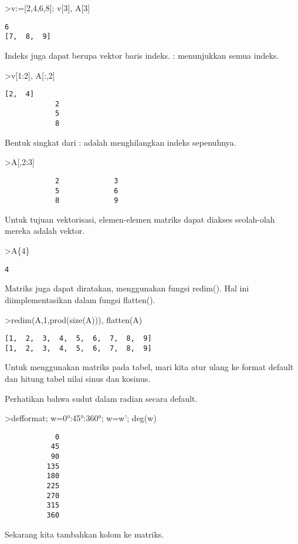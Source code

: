 \documentclass[
]{book}
\begin{document}
\textgreater v:={[}2,4,6,8{]}; v{[}3{]}, A{[}3{]}

\begin{verbatim}
6
[7,  8,  9]
\end{verbatim}

Indeks juga dapat berupa vektor baris indeks. : menunjukkan semua indeks.

\textgreater v{[}1:2{]}, A{[}:,2{]}

\begin{verbatim}
[2,  4]
            2 
            5 
            8 
\end{verbatim}

Bentuk singkat dari : adalah menghilangkan indeks sepenuhnya.

\textgreater A{[},2:3{]}

\begin{verbatim}
            2             3 
            5             6 
            8             9 
\end{verbatim}

Untuk tujuan vektorisasi, elemen-elemen matriks dapat diakses seolah-olah mereka adalah vektor.

\textgreater A\{4\}

\begin{verbatim}
4
\end{verbatim}

Matriks juga dapat diratakan, menggunakan fungsi redim(). Hal ini diimplementasikan dalam fungsi flatten().

\textgreater redim(A,1,prod(size(A))), flatten(A)

\begin{verbatim}
[1,  2,  3,  4,  5,  6,  7,  8,  9]
[1,  2,  3,  4,  5,  6,  7,  8,  9]
\end{verbatim}

Untuk menggunakan matriks pada tabel, mari kita atur ulang ke format default dan hitung tabel nilai sinus dan kosinus.

Perhatikan bahwa sudut dalam radian secara default.

\textgreater defformat; w=0°:45°:360°; w=w'; deg(w)

\begin{verbatim}
            0 
           45 
           90 
          135 
          180 
          225 
          270 
          315 
          360 
\end{verbatim}

Sekarang kita tambahkan kolom ke matriks.
\end{document}
